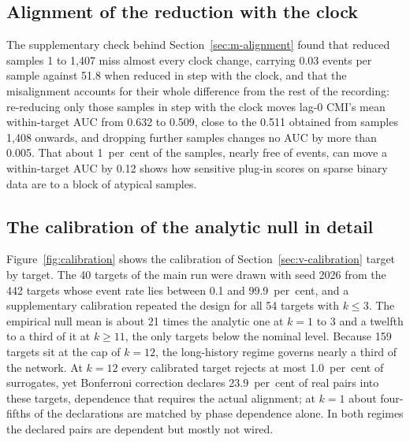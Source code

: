 \subsection{Alignment of the reduction with the clock}
\label{sec:m-alignment-detail}

The supplementary check behind Section~\ref{sec:m-alignment} found that reduced samples 1 to 1,407 miss almost every clock change, carrying 0.03 events per sample against 51.8 when reduced in step with the clock, and that the misalignment accounts for their whole difference from the rest of the recording: re-reducing only those samples in step with the clock moves lag-0 CMI's mean within-target AUC from 0.632 to 0.509, close to the 0.511 obtained from samples 1,408 onwards, and dropping further samples changes no AUC by more than 0.005. That about 1~per~cent of the samples, nearly free of events, can move a within-target AUC by 0.12 shows how sensitive plug-in scores on sparse binary data are to a block of atypical samples.


\subsection{The calibration of the analytic null in detail}

Figure~\ref{fig:calibration} shows the calibration of Section~\ref{sec:v-calibration} target by target. The 40 targets of the main run were drawn with seed 2026 from the 442 targets whose event rate lies between 0.1 and 99.9~per~cent, and a supplementary calibration repeated the design for all 54 targets with $k \le 3$. The empirical null mean is about 21 times the analytic one at $k = 1$ to 3 and a twelfth to a third of it at $k \ge 11$, the only targets below the nominal level. Because 159 targets sit at the cap of $k = 12$, the long-history regime governs nearly a third of the network. At $k = 12$ every calibrated target rejects at most 1.0~per~cent of surrogates, yet Bonferroni correction declares 23.9~per~cent of real pairs into these targets, dependence that requires the actual alignment; at $k = 1$ about four-fifths of the declarations are matched by phase dependence alone. In both regimes the declared pairs are dependent but mostly not wired.


